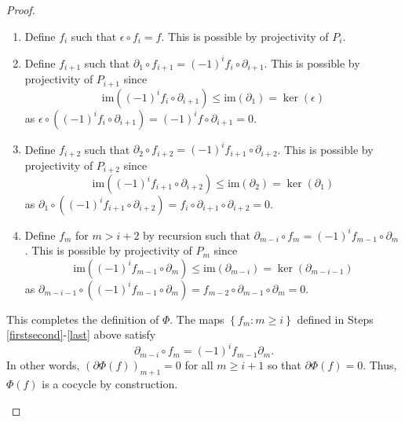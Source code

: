 \documentclass[12pt]{article}
\newcounter{savedenumii}
\begin{document}
\begin{proof}
\begin{enumerate}
\begin{enumerate}
\item\label{first} Define $f_i$ such that $\epsilon\circ f_i=f$.
This is possible by projectivity of $P_i$.
\item\label{firstsecond} Define $f_{i+1}$ such that $\partial_1\circ f_{i+1}
=\left(-1\right)^i f_i\circ\partial_{i+1}$.
This is possible by projectivity of $P_{i+1}$ since
\[\mathrm{im}\left(\left(-1\right)^i f_i\circ\partial_{i+1}\right)
\le\mathrm{im}\left(\partial_1\right)
=\ker\left(\epsilon\right)\]
as $\epsilon\circ\left(\left(-1\right)^i f_i\circ\partial_{i+1}\right)
=\left(-1\right)^i f\circ\partial_{i+1}=0$.
\item Define $f_{i+2}$ such that $\partial_2\circ f_{i+2}
=\left(-1\right)^i f_{i+1}\circ\partial_{i+2}$.
This is possible by projectivity of $P_{i+2}$ since
\[\mathrm{im}\left(\left(-1\right)^i f_{i+1}\circ\partial_{i+2}\right)
\le\mathrm{im}\left(\partial_2\right)
=\ker\left(\partial_1\right)\]
as $\partial_1\circ\left(\left(-1\right)^i
f_{i+1}\circ\partial_{i+2}\right)
=f_i\circ\partial_{i+1}\circ\partial_{i+2}=0$.
\item\label{last} Define $f_m$ for $m>i+2$ by recursion
such that $\partial_{m-i}\circ f_m
=\left(-1\right)^i f_{m-1}\circ\partial_m$.
This is possible by projectivity of $P_m$ since
\[\mathrm{im}\left(\left(-1\right)^i f_{m-1}\circ\partial_m\right)
\le\mathrm{im}\left(\partial_{m-i}\right)
=\ker\left(\partial_{m-i-1}\right)\]
as $\partial_{m-i-1}\circ\left(\left(-1\right)^i
f_{m-1}\circ\partial_m\right)
=f_{m-2}\circ\partial_{m-1}\circ\partial_m=0$.
\setcounter{savedenumii}{\value{enumii}}
\end{enumerate}
This completes the definition of $\Phi$.
The maps $\left\{f_m:m\ge i\right\}$
defined in Steps \ref{firstsecond}-\ref{last} above satisfy
\[\partial_{m-i}\circ f_m=\left(-1\right)^i f_{m-1}\partial_m.\]
In other words, $\left(\partial \Phi\left(f\right)\right)_{m+1}=0$ for all $m\ge i+1$
so that $\partial\Phi\left(f\right)=0$.
Thus, $\Phi\left(f\right)$ is a cocycle by construction.


\end{enumerate}
\end{proof}
\end{document}

